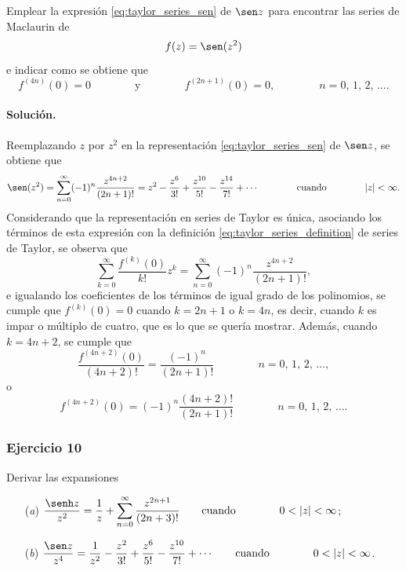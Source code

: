 \documentclass[a4paper]{report}
\begin{document}
Emplear la expresión \ref{eq:taylor_series_sen} de \(\sen z\) para encontrar las series de Maclaurin de
\[
 f(z)=\sen(z^2)
\]
e indicar como se obtiene que 
\[
 f^{(4n)}(0)=0
 \qquad\qquad\textrm{y}\qquad\qquad
 f^{(2n+1)}(0)=0,
 \qquad\qquad 
 n=0,\,1,\,2,\,\dots.
\]

\paragraph{Solución.} Reemplazando \(z\) por \(z^2\) en la representación \ref{eq:taylor_series_sen} de \(\sen z\), se  obtiene que 
\[
 \sen(z^2)=\sum_{n=0}^\infty(-1)^n\frac{z^{4n+2}}{(2n+1)!}=z^2-\frac{z^6}{3!}+\frac{z^{10}}{5!}-\frac{z^{14}}{7!}+\cdots
 \qquad\qquad\textrm{cuando}\qquad\qquad
 |z|<\infty.
\]
Considerando que la representación en series de Taylor es única, asociando los términos de esta expresión con la definición \ref{eq:taylor_series_definition} de series de Taylor, se observa que 
\[
 \sum_{k=0}^\infty\frac{f^{(k)}(0)}{k!}z^k=\sum_{n=0}^\infty(-1)^n\frac{z^{4n+2}}{(2n+1)!},
\]
e igualando los coeficientes de los términos de igual grado de los polinomios, se cumple que \(f^{(k)}(0)=0\) cuando \(k=2n+1\) o \(k=4n\), es decir, cuando \(k\) es impar o múltiplo de cuatro, que es lo que se quería mostrar. Además, cuando \(k=4n+2\), se cumple que
\[
 \frac{f^{(4n+2)}(0)}{(4n+2)!}=\frac{(-1)^n}{(2n+1)!}
 \qquad\qquad 
 n=0,\,1,\,2,\,\dots,
\]
o
\[
 f^{(4n+2)}(0)=(-1)^n\frac{(4n+2)!}{(2n+1)!}
 \qquad\qquad 
 n=0,\,1,\,2,\,\dots.
\]

\subsubsection*{Ejercicio 10}

Derivar las expansiones 
\begin{enumerate}
 \item[(\textit{a})] \(\displaystyle\frac{\senh z}{z^2}=\frac{1}{z}+\sum_{n=0}^\infty\frac{z^{2n+1}}{(2n+3)!}
 \qquad\textrm{cuando}\qquad\qquad
 0<|z|<\infty\);
 \item[(\textit{b})] \(\displaystyle\frac{\sen z}{z^4}=\frac{1}{z^2}-\frac{z^2}{3!}+\frac{z^6}{5!}-\frac{z^{10}}{7!}+\cdots
 \qquad\textrm{cuando}\qquad\qquad
 0<|z|<\infty\).
\end{enumerate}
\end{document}

